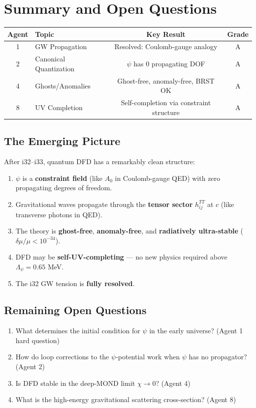 \documentclass[11pt,a4paper]{article}
\begin{document}
\section{Summary and Open Questions}
\label{sec:summary}

\begin{center}
\begin{tabular}{clcc}
\toprule
\textbf{Agent} & \textbf{Topic} & \textbf{Key Result} & \textbf{Grade} \\
\midrule
1 & GW Propagation & Resolved: Coulomb-gauge analogy & A \\
2 & Canonical Quantization & $\psi$ has 0 propagating DOF & A \\
4 & Ghosts/Anomalies & Ghost-free, anomaly-free, BRST OK & A \\
8 & UV Completion & Self-completion via constraint structure & A \\
\bottomrule
\end{tabular}
\end{center}

\subsection{The Emerging Picture}

After i32--i33, quantum DFD has a remarkably clean structure:

\begin{enumerate}
\item $\psi$ is a \textbf{constraint field} (like $A_0$ in Coulomb-gauge QED) with zero propagating degrees of freedom.
\item Gravitational waves propagate through the \textbf{tensor sector} $h_{ij}^{TT}$ at $c$ (like transverse photons in QED).
\item The theory is \textbf{ghost-free}, \textbf{anomaly-free}, and \textbf{radiatively ultra-stable} ($\delta\mu/\mu < 10^{-34}$).
\item DFD may be \textbf{self-UV-completing} --- no new physics required above $\Lambda_\psi = 0.65$ MeV.
\item The i32 GW tension is \textbf{fully resolved}.
\end{enumerate}

\subsection{Remaining Open Questions}

\begin{enumerate}
\item What determines the initial condition for $\psi$ in the early universe? (Agent 1 hard question)
\item How do loop corrections to the $\psi$-potential work when $\psi$ has no propagator? (Agent 2)
\item Is DFD stable in the deep-MOND limit $\chi \to 0$? (Agent 4)
\item What is the high-energy gravitational scattering cross-section? (Agent 8)
\end{enumerate}
\end{document}
